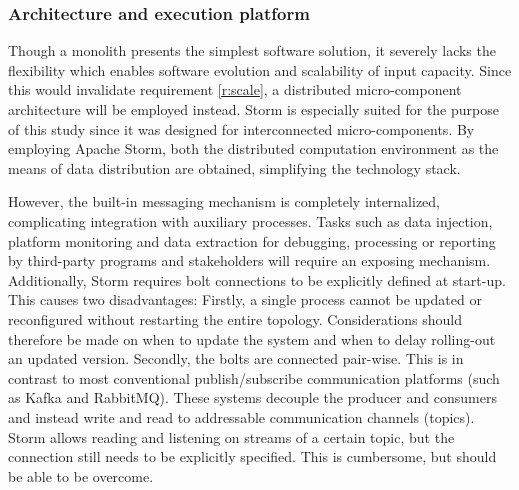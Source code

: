\subsubsection{Architecture and execution platform}
Though a monolith presents the simplest software solution, it severely lacks the flexibility which enables software evolution and scalability of input capacity. Since this would invalidate requirement \ref{r:scale}, a distributed micro-component architecture will be employed instead. Storm is especially suited for the purpose of this study since it was designed for interconnected micro-components. By employing Apache Storm, both the distributed computation environment as the means of data distribution are obtained, simplifying the technology stack.

However, the built-in messaging mechanism is completely internalized, complicating integration with auxiliary processes. Tasks such as data injection, platform monitoring and data extraction for debugging, processing or reporting by third-party programs and stakeholders will require an exposing mechanism. Additionally, Storm requires bolt connections to be explicitly defined at start-up. This causes two disadvantages: Firstly, a single process cannot be updated or reconfigured without restarting the entire topology. Considerations should therefore be made on when to update the system and when to delay rolling-out an updated version. Secondly, the bolts are connected pair-wise. This is in contrast to most conventional publish/subscribe communication platforms (such as Kafka and RabbitMQ). These systems decouple the producer and consumers and instead write and read to addressable communication channels (topics). Storm allows reading and listening on streams of a certain topic, but the connection still needs to be explicitly specified. This is cumbersome, but should be able to be overcome.



